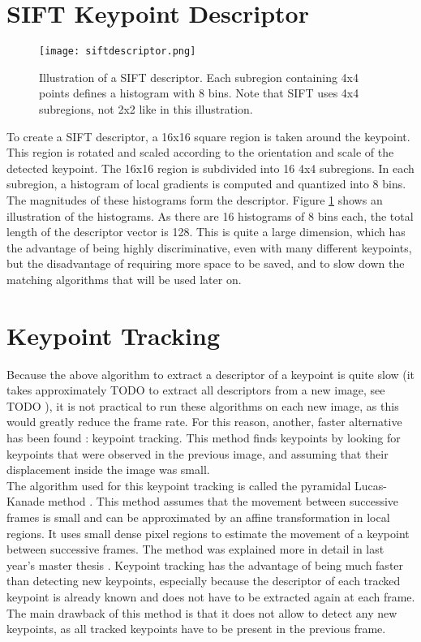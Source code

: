 \section{SIFT Keypoint Descriptor}
\begin{figure}[H]
  \centering
  \texttt{[image: siftdescriptor.png]}
    \caption{Illustration of a SIFT descriptor. Each subregion containing 4x4 points defines a histogram with 8 bins. Note that SIFT uses 4x4 subregions, not 2x2 like in this illustration. \cite{sift2}}
    \label{fig:siftdescriptor}
\end{figure}
To create a SIFT descriptor, a 16x16 square region is taken around the keypoint. This region is rotated and scaled according to the orientation and scale of the detected keypoint. The 16x16 region is subdivided into 16 4x4 subregions. In each subregion, a histogram of local gradients is computed and quantized into 8 bins. The magnitudes of these histograms form the descriptor. Figure \ref{fig:siftdescriptor} shows an illustration of the histograms. As there are 16 histograms of 8 bins each, the total length of the descriptor vector is 128. This is quite a large dimension, which has the advantage of being highly discriminative, even with many different keypoints, but the disadvantage of requiring more space to be saved, and to slow down the matching algorithms that will be used later on.
\cite{sift}

\section{Keypoint Tracking}
Because the above algorithm to extract a descriptor of a keypoint is quite slow (it takes approximately TODO %
to extract all descriptors from a new image, see TODO %
), it is not practical to run these algorithms on each new image, as this would greatly reduce the frame rate. For this reason, another, faster alternative has been found : keypoint tracking. This method finds keypoints by looking for keypoints that were observed in the previous image, and assuming that their displacement inside the image was small. \\
The algorithm used for this keypoint tracking is called the pyramidal Lucas-Kanade method \cite{pyramidallucaskanade}. This method assumes that the movement between successive frames is small and can be approximated by an affine transformation in local regions. It uses small dense pixel regions to estimate the movement of a keypoint between successive frames. The method was explained more in detail in last year's master thesis \cite{jacquesleclere}.
Keypoint tracking has the advantage of being much faster than detecting new keypoints, especially because the descriptor of each tracked keypoint is already known and does not have to be extracted again at each frame. The main drawback of this method is that it does not allow to detect any new keypoints, as all tracked keypoints have to be present in the previous frame.

